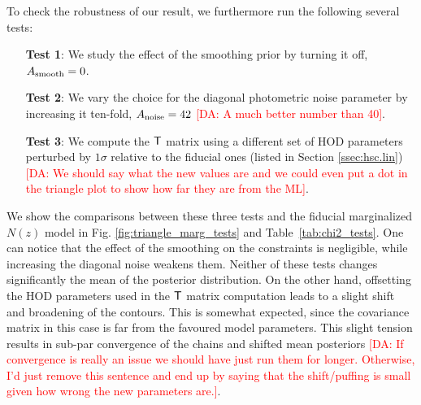 \documentclass[a4paper,11pt]{article}
\newcommand{\da}[1]{{\textcolor{red}{[DA: #1]}}}
\begin{document}
      To check the robustness of our result, we furthermore run the following several tests:
      \begin{itemize}
        \item[\textbf{Test 1}:] We study the effect of the smoothing prior by turning it off, $A_{\rm smooth} = 0$.
        \item[\textbf{Test 2}:] We vary the choice for the diagonal photometric noise parameter by increasing it ten-fold, $A_{\rm noise} = 42$ \da{A much better number than 40}.
        \item[\textbf{Test 3}:] We compute the ${\sf T}$ matrix using a different set of HOD parameters perturbed by $1\sigma$ relative to the fiducial ones (listed in Section \ref{ssec:hsc.lin}) \da{We should say what the new values are and we could even put a dot in the triangle plot to show how far they are from the ML}.
      \end{itemize}
      We show the comparisons between these three tests and the fiducial marginalized $N(z)$ model in Fig. \ref{fig:triangle_marg_tests} and Table~\ref{tab:chi2_tests}. One can notice that the effect of the smoothing on the constraints is negligible, while increasing the diagonal noise weakens them. Neither of these tests changes significantly the mean of the posterior distribution. On the other hand, offsetting the HOD parameters used in the ${\sf T}$ matrix computation leads to a slight shift and broadening of the contours. This is somewhat expected, since the covariance matrix in this case is far from the favoured model parameters. This slight tension results in sub-par convergence of the chains and shifted mean posteriors \da{If convergence is really an issue we should have just run them for longer. Otherwise, I'd just remove this sentence and end up by saying that the shift/puffing is small given how wrong the new parameters are.}.
\end{document}
